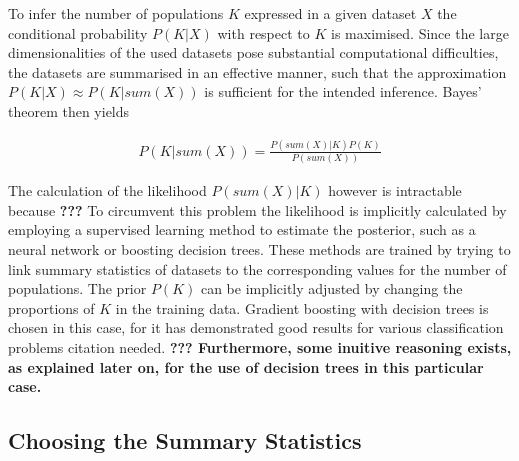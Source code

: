\documentclass[a4paper, 11pt]{article}
\begin{document}
To infer the number of populations $K$ expressed in a given dataset $X$ the conditional probability $P(K | X)$ with respect to $K$ is maximised. Since the large dimensionalities of the used datasets pose substantial computational difficulties, the datasets are summarised  in an effective manner, such that the approximation $P(K|X) \approx P(K | sum(X))$ is sufficient for the intended inference. Bayes' theorem then yields

\begin{align*}
P(K | sum(X)) = \frac{P(sum(X) | K) P(K)}{P(sum(X))}
\end{align*}

The calculation of the likelihood $P(sum(X) | K)$ however is intractable because \textbf{???}
To circumvent this problem the likelihood is implicitly calculated by employing a supervised learning method to estimate the posterior, such as a neural network or boosting decision trees. These methods are trained by trying to link summary statistics of datasets to the corresponding values for the number of populations. The prior $P(K)$ 
can be implicitly adjusted by changing the proportions of $K$ in the training data. Gradient boosting with decision trees is chosen in this case, for it has demonstrated good results for various classification problems citation needed. \textbf{??? Furthermore, some inuitive reasoning exists, as explained later on, for the use of decision trees in this particular case.}

\subsection{Choosing the Summary Statistics}
\end{document}
